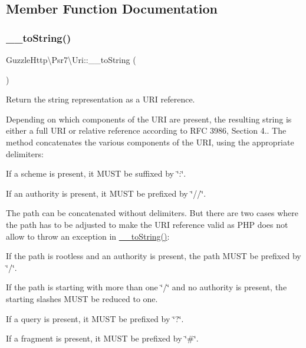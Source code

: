 \subsection{Member Function Documentation}
\mbox{\label{classGuzzleHttp_1_1Psr7_1_1Uri_a98b6fcc3c3be3fb070fcb95fec762e7f}} 
\subsubsection{\texorpdfstring{\+\_\+\+\_\+to\+String()}{\_\_toString()}}
{\footnotesize\ttfamily Guzzle\+Http\textbackslash{}\+Psr7\textbackslash{}\+Uri\+::\+\_\+\+\_\+to\+String (\begin{DoxyParamCaption}{ }\end{DoxyParamCaption})}

Return the string representation as a U\+RI reference.

Depending on which components of the U\+RI are present, the resulting string is either a full U\+RI or relative reference according to R\+FC 3986, Section 4.. The method concatenates the various components of the U\+RI, using the appropriate delimiters\+:


\begin{DoxyItemize}
\item If a scheme is present, it M\+U\+ST be suffixed by \char`\"{}\+:\char`\"{}.
\item If an authority is present, it M\+U\+ST be prefixed by \char`\"{}//\char`\"{}.
\item The path can be concatenated without delimiters. But there are two cases where the path has to be adjusted to make the U\+RI reference valid as P\+HP does not allow to throw an exception in \hyperlink{classGuzzleHttp_1_1Psr7_1_1Uri_a98b6fcc3c3be3fb070fcb95fec762e7f}{\+\_\+\+\_\+to\+String()}\+:
\begin{DoxyItemize}
\item If the path is rootless and an authority is present, the path M\+U\+ST be prefixed by \char`\"{}/\char`\"{}.
\item If the path is starting with more than one \char`\"{}/\char`\"{} and no authority is present, the starting slashes M\+U\+ST be reduced to one.
\end{DoxyItemize}
\item If a query is present, it M\+U\+ST be prefixed by \char`\"{}?\char`\"{}.
\item If a fragment is present, it M\+U\+ST be prefixed by \char`\"{}\#\char`\"{}.
\end{DoxyItemize}


